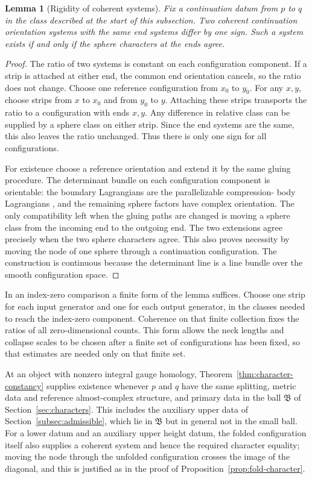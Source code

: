 \documentclass[11pt]{amsart}
\newtheorem{lemma}[theorem]{Lemma}
\theoremstyle{definition}
\theoremstyle{remark}
\theoremstyle{plain}
\numberwithin{equation}{section}
\begin{document}
\begin{lemma}[Rigidity of coherent systems]\label{lem:rigidity}
Fix a continuation datum from $p$ to $q$ in the
class described at the start of this subsection.
Two coherent continuation orientation systems
with the same end systems differ by one sign.
Such a system exists if and only if the sphere
characters at the ends agree.
\end{lemma}
\begin{proof}
The ratio of two systems is constant on each
configuration component. If a strip is attached
at either end, the common end orientation cancels,
so the ratio does not change. Choose one
reference configuration from $x_0$ to $y_0$.
For any $x,y$, choose strips from $x$ to $x_0$
and from $y_0$ to $y$. Attaching these strips
transports the ratio to a configuration with
ends $x,y$. Any difference in relative class
can be supplied by a sphere class on either
strip. Since the end systems are the same,
this also leaves the ratio unchanged. Thus
there is only one sign for all configurations.

For existence choose a reference orientation
and extend it by the same gluing procedure.
The determinant bundle on each configuration
component is orientable: the boundary
Lagrangians are the parallelizable compression-
body Lagrangians \cite[Theorem~5.1.6]{WW-orientations}, and the remaining sphere
factors have complex orientation. The only
compatibility left when the gluing paths are
changed is moving a sphere class from the
incoming end to the outgoing end. The two
extensions agree precisely when the two sphere
characters agree. This also proves necessity
by moving the node of one sphere through a
continuation configuration. The construction
is continuous because the determinant line
is a line bundle over the smooth
configuration space.
\end{proof}

In an index-zero comparison a finite form of
the lemma suffices. Choose one strip for each
input generator and one for each output
generator, in the classes needed to reach
the index-zero component. Coherence on that
finite collection fixes the ratios of all
zero-dimensional counts. This form allows
the neck lengths and collapse scales to be
chosen after a finite set of configurations has
been fixed, so that estimates are needed only on
that finite set.

At an object with nonzero integral gauge homology, Theorem~\ref{thm:character-constancy} supplies existence whenever $p$ and $q$ have the same
splitting, metric data and reference almost-complex structure, and primary
data in the ball $\mathfrak B$ of
Section~\ref{sec:characters}. This includes the
auxiliary upper data of
Section~\ref{subsec:admissible}, which lie in
$\mathfrak B$ but in general not in the small
ball. For a lower datum and an auxiliary upper
height datum, the folded configuration itself
also supplies a coherent system and hence the
required character equality; moving the node through
the unfolded configuration crosses the image of the
diagonal, and this is justified as in the proof of
Proposition~\ref{prop:fold-character}.
\end{document}
